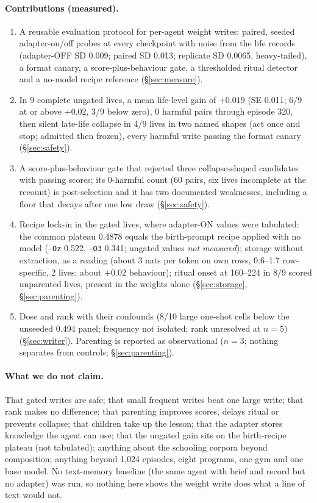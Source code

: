 \documentclass{article}
\newcommand{\nm}{\emph{not measured}}
\begin{document}
\paragraph{Contributions (measured).}
\begin{enumerate}
\item A reusable evaluation protocol for per-agent weight writes: paired, seeded adapter-on/off probes at every checkpoint with noise from the life records (adapter-OFF SD 0.009; paired SD 0.013; replicate SD 0.0065, heavy-tailed), a format canary, a score-plus-behaviour gate, a thresholded ritual detector and a no-model recipe reference (\S\ref{sec:measure}).
\item In 9 complete ungated lives, a mean life-level gain of $+0.019$ (SE 0.011; 6/9 at or above $+0.02$, 3/9 below zero), 0 harmful pairs through episode 320, then silent late-life collapse in 4/9 lives in two named shapes (act once and stop; admitted then frozen), every harmful write passing the format canary (\S\ref{sec:safety}).
\item A score-plus-behaviour gate that rejected three collapse-shaped candidates with passing scores; its 0-harmful count (60 pairs, six lives incomplete at the recount) is post-selection and it has two documented weaknesses, including a floor that decays after one low draw (\S\ref{sec:safety}).
\item Recipe lock-in in the gated lives, where adapter-ON values were tabulated: the common plateau 0.4878 equals the birth-prompt recipe applied with no model (\texttt{-Oz} 0.522, \texttt{-O3} 0.341; ungated values \nm); storage without extraction, as a reading (about 3 nats per token on own rows, 0.6--1.7 row-specific, 2 lives; about $+0.02$ behaviour); ritual onset at 160--224 in 8/9 scored unparented lives, present in the weights alone (\S\ref{sec:storage}, \S\ref{sec:parenting}).
\item Dose and rank with their confounds (8/10 large one-shot cells below the unseeded 0.494 panel; frequency not isolated; rank unresolved at $n = 5$) (\S\ref{sec:writer}). Parenting is reported as observational ($n = 3$; nothing separates from controls; \S\ref{sec:parenting}).
\end{enumerate}

\paragraph{What we do not claim.} That gated writes are safe; that small frequent writes beat one large write; that rank makes no difference; that parenting improves scores, delays ritual or prevents collapse; that children take up the lesson; that the adapter stores knowledge the agent can use; that the ungated gain sits on the birth-recipe plateau (not tabulated); anything about the schooling corpora beyond composition; anything beyond 1{,}024 episodes, eight programs, one gym and one base model. No text-memory baseline (the same agent with brief and record but no adapter) was run, so nothing here shows the weight write does what a line of text would not.
\end{document}
